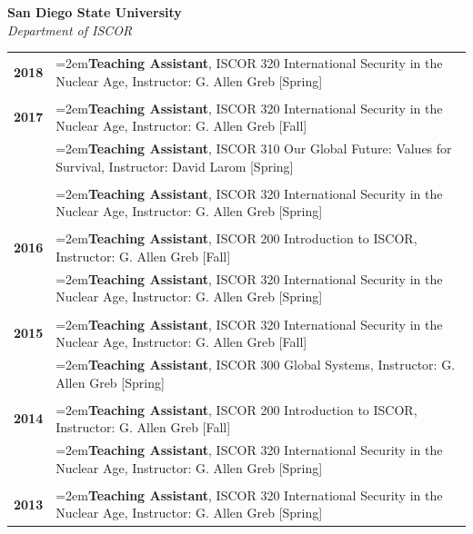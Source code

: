 \documentclass[letterpaper,12pt]{article}
\begin{document}
\textbf{San Diego State University}\\
\textit{Department of ISCOR}
\begin{xltabular}{\dimexpr\textwidth-0in}{p{1.5in}X}

\textbf{2018} 	& \hangindent=2em\textbf{Teaching Assistant}, ISCOR 320 International Security in the Nuclear Age, \mbox{Instructor:} G. Allen Greb [Spring]\\ \\

\textbf{2017} 	& \hangindent=2em\textbf{Teaching Assistant}, ISCOR 320 International Security in the Nuclear Age, \mbox{Instructor:} G. Allen Greb [Fall]\\

			& \hangindent=2em\textbf{Teaching Assistant}, ISCOR 310 Our Global Future: Values for Survival, \mbox{Instructor:} David Larom [Spring]\\ \\

			& \hangindent=2em\textbf{Teaching Assistant}, ISCOR 320 International Security in the Nuclear Age, \mbox{Instructor:} G. Allen Greb [Spring]\\ \\
			
\textbf{2016} 	& \hangindent=2em\textbf{Teaching Assistant}, ISCOR 200 Introduction to ISCOR, Instructor: G. Allen Greb [Fall]\\

			& \hangindent=2em\textbf{Teaching Assistant}, ISCOR 320 International Security in the Nuclear Age, \mbox{Instructor:} G. Allen Greb [Spring]\\ \\

\textbf{2015} 	& \hangindent=2em\textbf{Teaching Assistant}, ISCOR 320 International Security in the Nuclear Age, \mbox{Instructor:} G. Allen Greb [Fall]\\

			& \hangindent=2em\textbf{Teaching Assistant}, ISCOR 300 Global Systems, Instructor: G. Allen Greb [Spring]\\ \\
			
\textbf{2014} 	& \hangindent=2em\textbf{Teaching Assistant}, ISCOR 200 Introduction to ISCOR, Instructor: G. Allen Greb [Fall]\\

			& \hangindent=2em\textbf{Teaching Assistant}, ISCOR 320 International Security in the Nuclear Age, \mbox{Instructor:} G. Allen Greb [Spring]\\ \\
			
\textbf{2013} 	& \hangindent=2em\textbf{Teaching Assistant}, ISCOR 320 International Security in the Nuclear Age, \mbox{Instructor:} G. Allen Greb [Spring]
\end{xltabular}
\end{document}
